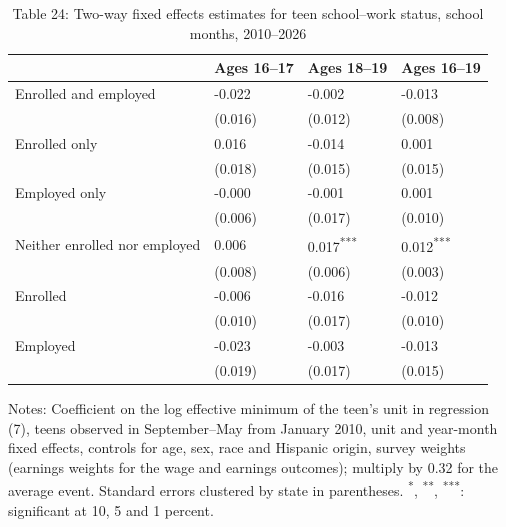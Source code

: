 \documentclass[12pt]{article}
\begin{document}
\begin{table}
\centering
\caption{Table 24: Two-way fixed effects estimates for teen school--work status, school months, 2010--2026}

\small
\begin{tabular}{p{}p{}p{}p{}}
\toprule
 & Ages 16--17 & Ages 18--19 & Ages 16--19 \\
\midrule
Enrolled and employed & -0.022 & -0.002 & -0.013 \\
 & (0.016) & (0.012) & (0.008) \\
Enrolled only & 0.016 & -0.014 & 0.001 \\
 & (0.018) & (0.015) & (0.015) \\
Employed only & -0.000 & -0.001 & 0.001 \\
 & (0.006) & (0.017) & (0.010) \\
Neither enrolled nor employed & 0.006 & 0.017\textsuperscript{***} & 0.012\textsuperscript{***} \\
 & (0.008) & (0.006) & (0.003) \\
Enrolled & -0.006 & -0.016 & -0.012 \\
 & (0.010) & (0.017) & (0.010) \\
Employed & -0.023 & -0.003 & -0.013 \\
 & (0.019) & (0.017) & (0.015) \\
\bottomrule
\end{tabular}



\noindent\small Notes: Coefficient on the log effective minimum of the teen's unit in regression (7), teens observed in September--May from January 2010, unit and year-month fixed effects, controls for age, sex, race and Hispanic origin, survey weights (earnings weights for the wage and earnings outcomes); multiply by 0.32 for the average event. Standard errors clustered by state in parentheses. \textsuperscript{*}, \textsuperscript{**}, \textsuperscript{***}: significant at 10, 5 and 1 percent.

\end{table}
\end{document}
